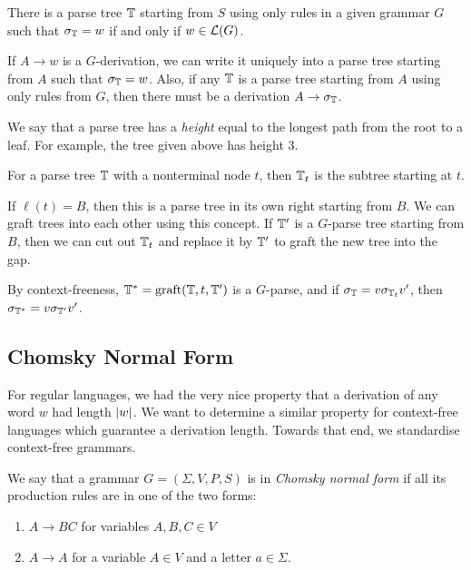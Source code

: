 \documentclass{article}
\begin{document}
\begin{proposition}
	There is a parse tree $\mathbb{T}$ starting from $S$ using only rules in a given grammar $G$ such that $\sigma_{\mathbb{T}} = w$ if and only if $w \in \mathcal{L}(G)$.
\end{proposition}

\begin{prf}
	If $A \to w$ is a $G$-derivation, we can write it uniquely into a parse tree starting from $A$ such that $\sigma_{\mathbb{T}} = w$. Also, if any $\mathbb{T}$ is a parse tree starting from $A$ using only rules from $G$, then there must be a derivation $A \to \sigma_{\mathbb{T}}$.
\end{prf}

We say that a parse tree has a \textit{height} equal to the longest path from the root to a leaf. For example, the tree given above has height 3.

For a parse tree $\mathbb{T}$ with a nonterminal node $t$, then $\mathbb{T}_t$ is the subtree starting at $t$.

If $\ell(t) = B$, then this is a parse tree in its own right starting from $B$. We can graft trees into each other using this concept. If $\mathbb{T}'$ is a $G$-parse tree starting from $B$, then we can cut out $\mathbb{T}_t$ and replace it by $\mathbb{T}'$ to graft the new tree into the gap.

By context-freeness, $\mathbb{T}^* = \mathrm{graft}(\mathbb{T}, t, \mathbb{T}')$ is a $G$-parse, and if $\sigma_{\mathbb{T}} = v \sigma_{\mathbb{T}_t} v'$, then $\sigma_{\mathbb{T}^*} = v \sigma_{\mathbb{T}'} v'$.

\subsection{Chomsky Normal Form}

For regular languages, we had the very nice property that a derivation of any word $w$ had length $\left\lvert w \right\rvert$. We want to determine a similar property for context-free languages which guarantee a derivation length. Towards that end, we standardise context-free grammars.

\begin{definition}
	We say that a grammar $G = (\Sigma, V, P, S)$ is in \textit{Chomsky normal form} if all its production rules are in one of the two forms:
	\begin{enumerate}
		\item $A \to BC$ for variables $A, B, C \in V$
		\item $A \to A$ for a variable $A \in V$ and a letter $a \in \Sigma$.
	\end{enumerate}
\end{definition}
\end{document}
